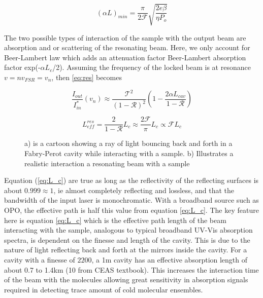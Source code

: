 \documentclass[a4paper]{book}
\newcommand{\imginput}[1]{} %
\begin{document}
\begin{equation}
\label{eq:CEASlimit}
(\alpha L)_{min}=\dfrac{\pi}{2\mathcal{F}}\sqrt{\dfrac{2e\beta}{\eta P_o}}
\end{equation}

The two possible types of interaction of the sample with the output beam are absorption and or scattering of the resonating beam. Here, we only account for Beer-Lambert law which adds an attenuation factor Beer-Lambert absorption factor exp(-$\alpha L_c$/2).
Assuming the frequency of the locked beam is at resonance $v=nv_{FSR}=v_n$, then \eqref{eq:res} becomes 

\begin{equation} \label{eq:CEAS}
\dfrac{I_{out}}{I_{in}^*}(v_n) \approx \dfrac{\mathcal{T}^2 }{({1-\mathcal{R}})^2}  \left(1- \dfrac{2\alpha L_{cav}}{1-\mathcal{R}}\right)
\end{equation}

\begin{equation} \label{eq:L_c}
L_{eff}^{res}=\dfrac{2}{1-\mathcal{R}} L_c 
\approx
\dfrac{2\mathcal{F}}{\pi} L_c
\propto \mathcal{F}L_c
\end{equation}		

\begin{figure} [!ht]
	\centering
	\def\svgwidth{\columnwidth}
	\resizebox{150mm}{!}{\imginput{images/CEAS-cartoon.pdf_tex}}
	\label{fig:CEAS}
	\caption{a) is a cartoon showing a ray of light bouncing back and forth in a Fabry-Perot cavity while interacting with a sample. b) Illustrates a realistic interaction a resonating beam with a sample }
\end{figure}

Equation (\ref{eq:L_c}) are true as long as the reflectivity of the reflecting surfaces is about $0.999 \approx 1$, ie almost completely reflecting and lossless, and that the bandwidth of the input laser is monochromatic. With a broadband source such as OPO, the effective path is half this value from equation \ref{eq:L_c}. 
The key feature here is equation \ref{eq:L_c} which is the effective path length of the beam interacting with the sample, analogous to typical broadband UV-Vis absorption spectra, is dependent on the finesse and length of the cavity. 
This is due to the nature of light reflecting back and forth at the mirrors inside the cavity. For a cavity with a finesse of $2200$, a 1m cavity has an effective absorption length of about 0.7 to 1.4km (10 from CEAS textbook). 
This increases the interaction time of the beam with the molecules allowing great sensitivity in absorption signals required in detecting trace amount of cold molecular ensembles.
\end{document}
